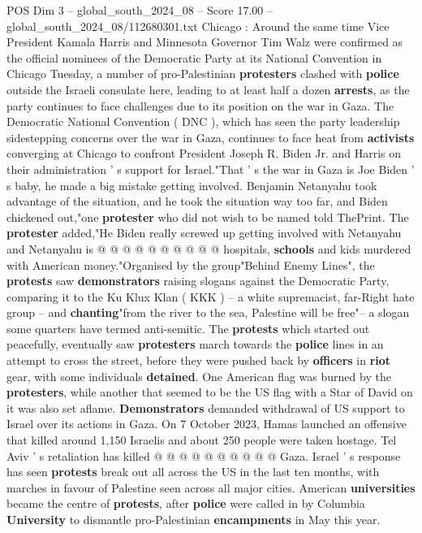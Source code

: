 \begin{textsample}{POS Dim 3 – global\_south\_2024\_08 – Score 17.00 – global\_south\_2024\_08/112680301.txt}  \label{ex:f3_pos_331}
Chicago : Around the same time Vice President Kamala Harris and Minnesota Governor Tim Walz were confirmed as the official nominees of the Democratic Party at its National Convention in Chicago Tuesday, a number of pro-Palestinian \textbf{protesters} clashed with \textbf{police} outside the Israeli consulate here, leading to at least half a dozen \textbf{arrests}, as the party continues to face challenges due to its position on the war in Gaza.
The Democratic National Convention ( DNC ), which has seen the party leadership sidestepping concerns over the war in Gaza, continues to face heat from \textbf{activists} converging at Chicago to confront President Joseph R.
Biden Jr. and Harris on their administration ' s support for Israel."That ' s the war in Gaza is Joe Biden ' s baby, he made a big mistake getting involved.
Benjamin Netanyahu took advantage of the situation, and he took the situation way too far, and Biden chickened out,"one \textbf{protester} who did not wish to be named told ThePrint.
The \textbf{protester} added,"He Biden really screwed up getting involved with Netanyahu and Netanyahu is @ @ @ @ @ @ @ @ @ @ hospitals, \textbf{schools} and kids murdered with American money."Organised by the group"Behind Enemy Lines", the \textbf{protests} saw \textbf{demonstrators} raising slogans against the Democratic Party, comparing it to the Ku Klux Klan ( KKK ) -- a white supremacist, far-Right hate group -- and \textbf{chanting}"from the river to the sea, Palestine will be free"-- a slogan some quarters have termed anti-semitic.
The \textbf{protests} which started out peacefully, eventually saw \textbf{protesters} march towards the \textbf{police} lines in an attempt to cross the street, before they were pushed back by \textbf{officers} in \textbf{riot} gear, with some individuals \textbf{detained}.
One American flag was burned by the \textbf{protesters}, while another that seemed to be the US flag with a Star of David on it was also set aflame. \textbf{Demonstrators} demanded withdrawal of US support to Israel over its actions in Gaza.
On 7 October 2023, Hamas launched an offensive that killed around 1,150 Israelis and about 250 people were taken hostage.
Tel Aviv ' s retaliation has killed @ @ @ @ @ @ @ @ @ @ Gaza.
Israel ' s response has seen \textbf{protests} break out all across the US in the last ten months, with marches in favour of Palestine seen across all major cities.
American \textbf{universities} became the centre of \textbf{protests}, after \textbf{police} were called in by Columbia \textbf{University} to dismantle pro-Palestinian \textbf{encampments} in May this year.

\end{textsample}
